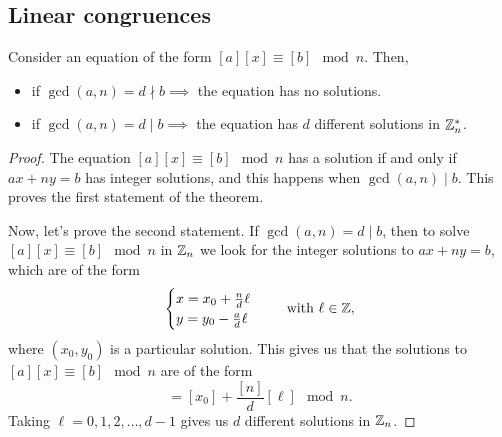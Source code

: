 \subsection{Linear congruences}

\begin{theorem}
    Consider an equation of the form $[a][x]\equiv[b]\mod n$. Then,
    \begin{itemize}[itemsep = -2pt]
        \item if $\gcd\left( a, n \right) = d \nmid b\implies$ the equation has no solutions.
        \item if $\gcd\left( a, n \right) = d\mid b\implies$ the equation has $d$ different solutions in
            $\mathbb{Z}^*_n$.
    \end{itemize}
\end{theorem}

\begin{proof}
    The equation $[a][x]\equiv[b]\mod n$ has a solution if and only if $ax + ny = b$ has integer solutions,
    and this happens when $\gcd\left( a, n \right) \mid b$. This proves the first statement of the theorem.

    Now, let's prove the second statement. If $\gcd\left( a, n \right) = d\mid b$, then to solve $[a][x]
    \equiv[b]\mod n$ in $\mathbb{Z}_n$ we look for the integer solutions to $ax + ny = b$, which are of the form
    \begin{equation}
        \begin{cases}
            x = x_0 + \frac{n}{d}\ell \\
            y = y_0 - \frac{a}{d}\ell
        \end{cases}\quad\textrm{ with } \ell\in\mathbb{Z},
    \end{equation}
    where $\left( x_0, y_0 \right) $ is a particular solution. This gives us that the solutions to $[a][x]
    \equiv[b]\mod n$ are of the form
    \begin{equation}
        [x] = [x_0] + \frac{[n]}{d}[\ell]\mod n.
    \end{equation}
    Taking $\ell = 0, 1, 2, \ldots, d - 1$ gives us $d$ different solutions in $\mathbb{Z}_n$.
\end{proof}
